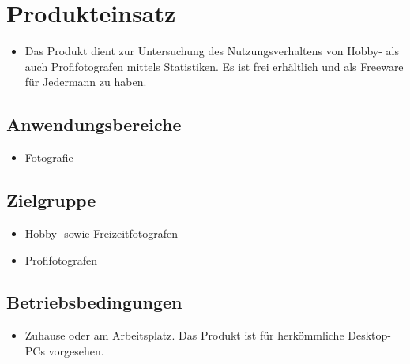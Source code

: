 \section{Produkteinsatz}
  \begin{itemize}
  \item Das Produkt dient zur Untersuchung des Nutzungsverhaltens von Hobby- als auch Profifotografen mittels Statistiken. Es ist frei erhältlich und als Freeware für Jedermann zu haben.
  \end{itemize}
\subsection{Anwendungsbereiche}
  \begin{itemize}
  \item Fotografie
  \end{itemize}

\subsection{Zielgruppe}
	\begin{itemize}
		\item Hobby- sowie Freizeitfotografen
		\item Profifotografen		
	\end{itemize}

\subsection{Betriebsbedingungen}
  \begin{itemize}
  		\item Zuhause oder am Arbeitsplatz. Das Produkt ist für herkömmliche Desktop-PCs vorgesehen.
  \end{itemize}
